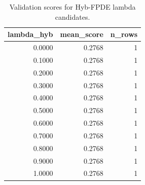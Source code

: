 \begin{table}[t]
\caption{Validation scores for Hyb-FPDE lambda candidates.}
\label{tab:lambda_distribution_computed}
\centering
\begin{tabular}{rrr}
\toprule
lambda\_hyb & mean\_score & n\_rows \\
\midrule
0.0000 & 0.2768 & 1 \\
0.1000 & 0.2768 & 1 \\
0.2000 & 0.2768 & 1 \\
0.3000 & 0.2768 & 1 \\
0.4000 & 0.2768 & 1 \\
0.5000 & 0.2768 & 1 \\
0.6000 & 0.2768 & 1 \\
0.7000 & 0.2768 & 1 \\
0.8000 & 0.2768 & 1 \\
0.9000 & 0.2768 & 1 \\
1.0000 & 0.2768 & 1 \\
\bottomrule
\end{tabular}

\end{table}
